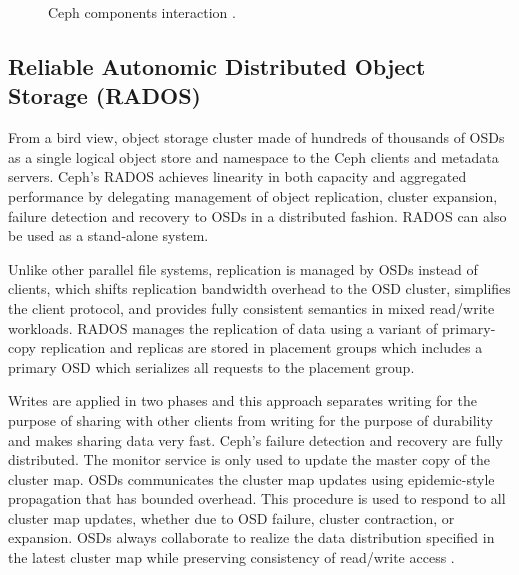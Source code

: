 \documentclass[9pt,twocolumn,twoside]{styles/osajnl}
\newcommand{\TODO}[2][]{\todo[color=red!10,inline,#1]{#2}}
\newcommand{\TE}{\TODO{Term}}
\begin{document}
\begin{figure}[htbp]
\centering
{}
\caption{Ceph components interaction \cite{paper-ceph-hadoop}.}
\label{CCI}
\end{figure}

\subsection{Reliable Autonomic Distributed Object Storage (RADOS)}
From a bird view, object storage cluster made of hundreds of thousands
of OSDs as a
single logical object store and namespace to the Ceph clients and
metadata servers. Ceph’s RADOS achieves linearity in both capacity and
aggregated performance by delegating management of object replication,
cluster expansion, failure detection and recovery to OSDs in a
distributed fashion. RADOS can also be used as a stand-alone system.

Unlike other parallel file systems, replication is managed by OSDs
instead of clients, which shifts replication bandwidth overhead to the
OSD cluster, simplifies the client protocol, and provides fully
consistent semantics in mixed read/write workloads. RADOS manages the
replication of data using a variant of primary-copy replication and
replicas are stored in placement groups which includes a primary OSD
which serializes all requests to the placement group.

Writes are applied in two phases and this approach separates writing
for the purpose of sharing with other clients from writing for the
purpose of durability \TE and makes sharing data very fast. Ceph’s failure
detection and recovery are fully distributed. The monitor service is
only used to update the master copy of the cluster map. OSDs
communicates the cluster map updates using epidemic-style propagation
that has bounded overhead. This procedure is used to respond to all
cluster map updates, whether due to OSD failure, cluster contraction,
or expansion. OSDs always collaborate to realize the data distribution
specified in the latest cluster map while preserving consistency of
read/write access \cite{paper-ceph-hadoop}.
\end{document}
